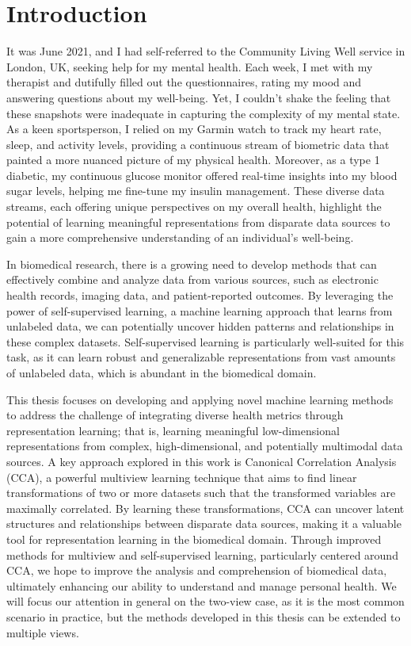\chapter{Introduction}\label{chap:introduction}
It was June 2021, and I had self-referred to the Community Living Well service in London, UK, seeking help for my mental health. Each week, I met with my therapist and dutifully filled out the questionnaires, rating my mood and answering questions about my well-being. Yet, I couldn't shake the feeling that these snapshots were inadequate in capturing the complexity of my mental state. As a keen sportsperson, I relied on my Garmin watch to track my heart rate, sleep, and activity levels, providing a continuous stream of biometric data that painted a more nuanced picture of my physical health. Moreover, as a type 1 diabetic, my continuous glucose monitor offered real-time insights into my blood sugar levels, helping me fine-tune my insulin management. These diverse data streams, each offering unique perspectives on my overall health, highlight the potential of learning meaningful representations from disparate data sources to gain a more comprehensive understanding of an individual's well-being.

In biomedical research, there is a growing need to develop methods that can effectively combine and analyze data from various sources, such as electronic health records, imaging data, and patient-reported outcomes. By leveraging the power of self-supervised learning, a machine learning approach that learns from unlabeled data, we can potentially uncover hidden patterns and relationships in these complex datasets. Self-supervised learning is particularly well-suited for this task, as it can learn robust and generalizable representations from vast amounts of unlabeled data, which is abundant in the biomedical domain.

This thesis focuses on developing and applying novel machine learning methods to address the challenge of integrating diverse health metrics through representation learning; that is, learning meaningful low-dimensional representations from complex, high-dimensional, and potentially multimodal data sources. 
A key approach explored in this work is Canonical Correlation Analysis (CCA), a powerful multiview learning technique that aims to find linear transformations of two or more datasets such that the transformed variables are maximally correlated. By learning these transformations, CCA can uncover latent structures and relationships between disparate data sources, making it a valuable tool for representation learning in the biomedical domain. Through improved methods for multiview and self-supervised learning, particularly centered around CCA, we hope to improve the analysis and comprehension of biomedical data, ultimately enhancing our ability to understand and manage personal health.
We will focus our attention in general on the two-view case, as it is the most common scenario in practice, but the methods developed in this thesis can be extended to multiple views.

